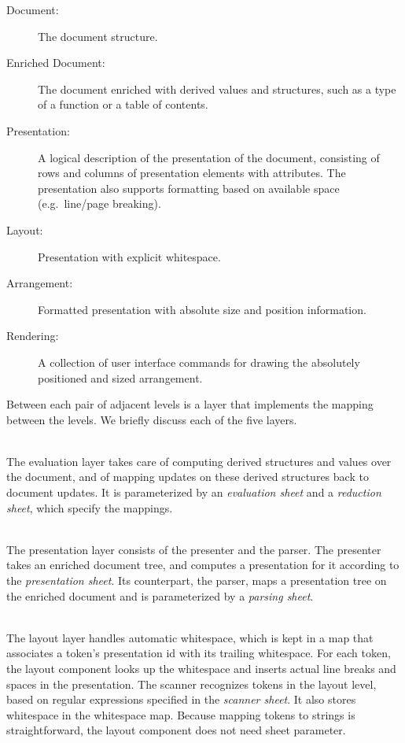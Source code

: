\documentclass[12pt]{article}
\begin{document}
\begin{description}
\item[Document:] The document structure.

\item[Enriched Document:] The document enriched with derived values and structures, such as a type of a function or a table of contents.

\item[Presentation:] A logical description of the presentation of the document, consisting of rows and columns of presentation elements with attributes. The presentation also supports formatting based on available space (e.g.\ line/page breaking).

\item[Layout:]  Presentation with explicit whitespace.

\item[Arrangement:] Formatted presentation with absolute size and position information.

\item[Rendering:] A collection of user interface commands for drawing the absolutely positioned and sized arrangement.
\end{description}

Between each pair of adjacent levels is a layer that implements the mapping between the levels. We briefly discuss each of the five layers.

\\
The evaluation layer takes care of computing derived structures and values over the document, and of mapping updates on these derived structures back to document updates. It is parameterized by an {\em evaluation sheet} and a {\em reduction sheet}, which specify the mappings. 

\\
The presentation layer consists of the presenter and the parser. The presenter takes an enriched document tree, and computes a presentation for it according to the {\em presentation sheet}. Its counterpart, the parser, maps a presentation tree on the enriched document and is parameterized by a {\em parsing sheet}.

\\
The layout layer handles automatic whitespace, which is kept in a map that associates a token's presentation id with its trailing whitespace. For each token, the layout component looks up the whitespace and inserts actual line breaks and spaces in the presentation. The scanner recognizes tokens in the layout level, based on regular expressions specified in the {\em scanner sheet}. It also stores whitespace in the whitespace map. Because mapping tokens to strings is straightforward, the layout component does not need sheet parameter.
\end{document}
